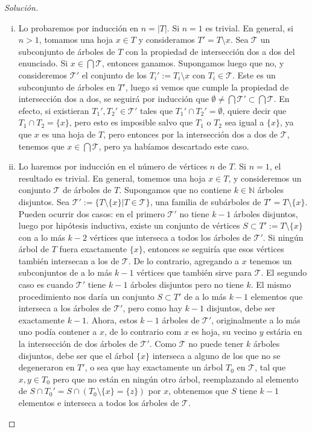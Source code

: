 \documentclass[12pt]{report}
\theoremstyle{plain}
\theoremstyle{definition}
\newenvironment{solution}{\begin{proof}[Solución]}{\end{proof}}
\newcommand{\naturals}{\mathbb{N}}
\newcommand{\abs}[1]{\left \vert #1 \right \vert}
\begin{document}
\begin{solution}
    \begin{enumerate}[(i)]
    \item Lo probaremos por inducción en $n = \abs T$. Si $n = 1$ es trivial. En general, si $n>1$, tomamos una hoja $x \in T$ y consideramos $T' = T \setminus x$. Sea $\mathcal T$ un subconjunto de árboles de $T$ con la propiedad de intersección dos a dos del enunciado. Si $x \in \bigcap \mathcal T$, entonces ganamos. Supongamos luego que no, y consideremos $\mathcal T '$ el conjunto de los $T_i' := T_i \setminus x$ con $T_i \in \mathcal T$. Este es un subconjunto de árboles en $T'$, luego si vemos que cumple la propiedad de intersección dos a dos, se seguirá por inducción que $\emptyset \neq \bigcap \mathcal T ' \subset \bigcap \mathcal T$. En efecto, si existieran $T_1', T_2' \in \mathcal T'$ tales que $T_1' \cap T_2' = \emptyset$, quiere decir que $T_1 \cap T_2 = \{x\}$, pero esto es imposible salvo que $T_1$ o  $T_2$ sea igual a $\{ x \}$, ya que $x$ es una hoja de $T$, pero entonces por la intersección dos a dos de $\mathcal T$, tenemos que $x \in \bigcap \mathcal T$, pero ya habíamos descartado este caso.
    \item Lo haremos por inducción en el número de vértices $n$ de $T$. Si $n = 1$, el resultado es trivial. En
    general, tomemos una hoja $x \in T$, y consideremos un conjunto $\mathcal T$ de árboles de $T$. Supongamos que no
     contiene $k \in \naturals$ árboles disjuntos. Sea $\mathcal T ' := \{ T \setminus \{x \} | T \in \mathcal T \}$, una familia de subárboles de $T' = T \setminus \{x\}$.
      Pueden ocurrir dos casos: en el primero $\mathcal T'$ no tiene $k-1$ árboles disjuntos, luego por hipótesis
      inductiva, existe un conjunto de vértices $S \subset T' := T \setminus \{x\}$ con a lo más $k-2$ vértices que
      interseca a todos los árboles de $\mathcal T'$. Si ningún árbol de $T$ fuera exactamente $\{x\}$, entonces se
      seguiría que esos vértices también intersecan a los de $\mathcal T$. De lo contrario, agregando a $x$ tenemos
      un subconjuntos de a lo más $k-1$ vértices que también sirve para $\mathcal T$. El segundo caso es cuando $\mathcal T '$ tiene $k-1$ árboles disjuntos pero no tiene $k$. El mismo procedimiento nos daría un conjunto $S \subset T'$ de a lo más $k-1$ elementos que interseca a los árboles de $\mathcal T'$, pero como hay $k-1$ disjuntos, debe ser exactamente $k-1$. Ahora, estos $k-1$ árboles de $\mathcal T'$, originalmente a lo más uno podía contener a $x$, de lo contrario com $x$ es hoja, su vecino $y$ estária en la intersección de dos árboles de $\mathcal T '$. Como $\mathcal T$ no puede tener $k$ árboles disjuntos, debe ser que el árbol $\{x\}$ interseca a alguno de los que no se degeneraron en $T'$, o sea que hay exactamente un árbol $T_0$ en $\mathcal T$, tal que $x,y \in T_0$ pero que no están en ningún otro árbol, reemplazando al elemento de $S \cap T_0' = S \cap (T_0 \setminus \{x\} = \{z\})$ por $x$, obtenemos que $S$ tiene $k-1$ elementos e interseca a todos los árboles de $\mathcal T$.
    \end{enumerate}
\end{solution}
\end{document}
